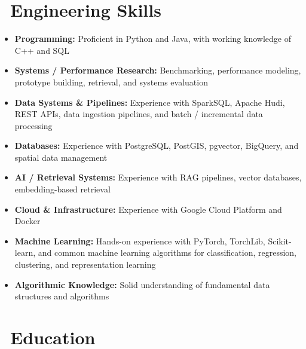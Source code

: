 \documentclass{resume}
\begin{document}
\section{\faCogs\ \textbf{Engineering Skills}}

\begin{itemize}[parsep=0.4ex]

\item \textbf{Programming:} Proficient in Python and Java, with working knowledge of C++ and SQL

\item \textbf{Systems / Performance Research:} Benchmarking, performance modeling, prototype building, retrieval, and systems evaluation

\item \textbf{Data Systems \& Pipelines:} Experience with SparkSQL, Apache Hudi, REST APIs, data ingestion pipelines, and batch / incremental data processing

\item \textbf{Databases:} Experience with PostgreSQL, PostGIS, pgvector, BigQuery, and spatial data management

\item \textbf{AI / Retrieval Systems:} Experience with RAG pipelines, vector databases, embedding-based retrieval

\item \textbf{Cloud \& Infrastructure:} Experience with Google Cloud Platform and Docker

\item \textbf{Machine Learning:} Hands-on experience with PyTorch, TorchLib, Scikit-learn, and common machine learning algorithms for classification, regression, clustering, and representation learning

  \item \textbf{Algorithmic Knowledge:} Solid understanding of fundamental data structures and algorithms
\end{itemize}

\section{\faGraduationCap\ \textbf{Education}}
\end{document}
